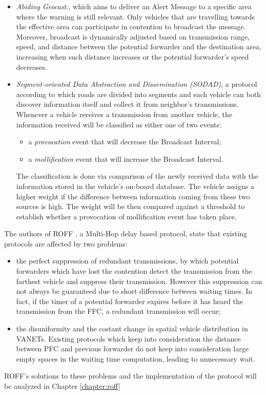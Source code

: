 \begin{enumerate}
\begin{enumerate}
\begin{itemize}
				\item \textit{Abiding Geocast:}\cite{4531929}, which aims to deliver an Alert Message to a specific area where the warning is still relevant. Only vehicles that are travelling towards the effective area can participate in contention to broadcast the message. Moreover, broadcast is dynamically adjusted based on transmission range, speed, and distance between the potential forwarder and the destination area, increasing when such distance increases or the potential forwarder's speed decreases.
				
				\item \textit{Segment-oriented Data Abstraction and Dissemination
					(SODAD)}\cite{1402433}, a protocol according to which roads are divided into segments and each vehicle can both discover information itself and collect it from neighbor's transmissions. Whenever a vehicle receives a transmission from another vehicle, the information received will be classified as either one of two events:
					\begin{itemize}
						\item a \textit{provocation} event that will decrease the Broadcast Interval;
						\item a \textit{mollification} event that will increase the Broadcast Interval.
					\end{itemize}
					The classification is done via comparison of the newly received data with the information stored in the vehicle's on-board database. The vehicle assigns a higher weight if the difference between information coming from these two sources is high. The weight will be then compared against a threshold to establish whether a provocation of mollification event has taken place.
			\end{itemize}
		
		The authors of ROFF \cite{6906275}, a Multi-Hop delay based protocol, state that existing protocols are affected by two problems:
		\begin{itemize}
			\item the perfect suppression of redundant transmissions, by which potential forwarders which have lost the contention detect the transmission from the farthest vehicle and suppress their transmission. However this suppression can not always be guaranteed due to short difference between waiting times. In fact, if the timer of a potential forwarder expires before it has heard the transmission from the FFC, a redundant transmission will occur;
			\item the disuniformity and the costant change in spatial vehicle distribution in VANETs. Existing protocols which keep into consideration the distance between PFC and previous forwarder do not keep into consideration large empty spaces in the waiting time computation, leading to unnecessary wait.
		\end{itemize}
		ROFF's solutions to these problems and the implementation of the protocol will be analyzed in Chapter \ref{chapter:roff}
		

\end{enumerate}
\end{enumerate}
